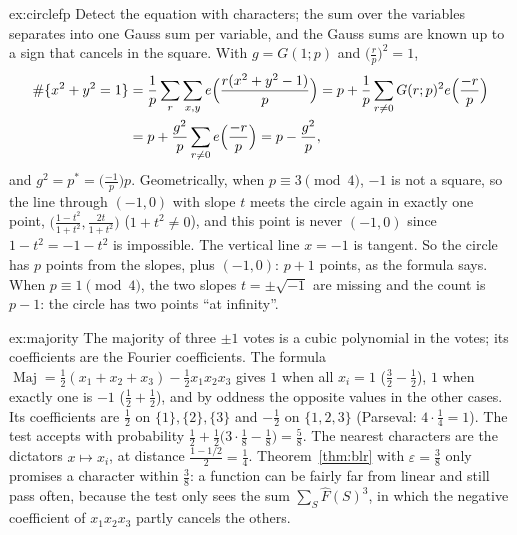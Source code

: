 \begin{solution}{ex:circlefp}
\idea Detect the equation with characters; the sum over the variables separates into one Gauss sum per variable, and the
Gauss sums are known up to a sign that cancels in the square.
\writeup With $g=G(1;p)$ and $\bigl(\frac rp\bigr)^2=1$,
\[\begin{aligned}\#\{x^2+y^2=1\}&=\frac1p\sum_{r}\sum_{x,y}e\Bigl(\frac{r(x^2+y^2-1)}p\Bigr)=p+\frac1p\sum_{r\ne0}G(r;p)^2e\Bigl(\frac{-r}p\Bigr)\\&=p+\frac{g^2}p\sum_{r\ne0}e\Bigl(\frac{-r}p\Bigr)=p-\frac{g^2}p,\end{aligned}\]
and $g^2=p^*=\bigl(\frac{-1}p\bigr)p$. Geometrically, when $p\equiv3\pmod4$, $-1$ is not a square, so the line through $(-1,0)$ with slope $t$ meets the circle again
in exactly one point, $\bigl(\frac{1-t^2}{1+t^2},\frac{2t}{1+t^2}\bigr)$ ($1+t^2\ne0$), and this point is never $(-1,0)$ since $1-t^2=-1-t^2$ is impossible. The vertical line
$x=-1$ is tangent. So the circle has $p$ points from the slopes, plus $(-1,0)$: $p+1$ points, as the formula says. When $p\equiv1\pmod4$, the two slopes
$t=\pm\sqrt{-1}$ are missing and the count is $p-1$: the circle has two points ``at infinity''.
\end{solution}

\begin{solution}{ex:majority}
\idea The majority of three $\pm1$ votes is a cubic polynomial in the votes; its coefficients are the Fourier coefficients.
\writeup The formula $\operatorname{Maj}=\frac12(x_1+x_2+x_3)-\frac12x_1x_2x_3$ gives $1$ when all $x_i=1$ ($\frac32-\frac12$), $1$ when exactly one is $-1$
($\frac12+\frac12$), and by oddness the opposite values in the other cases. Its coefficients are $\frac12$ on $\{1\},\{2\},\{3\}$ and $-\frac12$ on $\{1,2,3\}$
(Parseval: $4\cdot\frac14=1$). The test accepts with probability $\frac12+\frac12\bigl(3\cdot\frac18-\frac18\bigr)=\frac58$. The nearest characters are the
dictators $x\mapsto x_i$, at distance $\frac{1-1/2}2=\frac14$. Theorem~\ref{thm:blr} with $\varepsilon=\frac38$ only promises a character within $\frac38$: a function can be fairly far
from linear and still pass often, because the test only sees the sum $\sum_S\hat F(S)^3$, in which the negative coefficient of $x_1x_2x_3$ partly cancels the others.
\end{solution}

